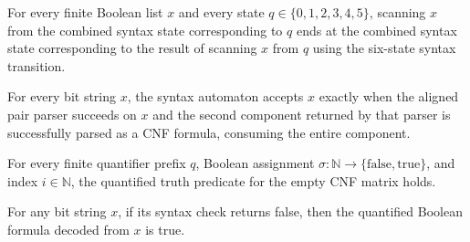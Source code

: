 \begin{theorem}
\label{Complexity.LogProg.TQBFARM.synStep_matrix}
\leanok
{}
For every finite Boolean list $x$ and every state $q \in \{0,1,2,3,4,5\}$, scanning $x$
from the combined syntax state corresponding to $q$ ends at the combined syntax state
corresponding to the result of scanning $x$ from $q$ using the six-state syntax
transition.
\end{theorem}

\begin{theorem}
\label{Complexity.LogProg.TQBFARM.synOK_spec}
\leanok
{}
For every bit string $x$, the syntax automaton accepts $x$ exactly when the aligned pair
parser succeeds on $x$ and the second component returned by that parser is successfully
parsed as a CNF formula, consuming the entire component.
\end{theorem}

\begin{theorem}
\label{Complexity.LogProg.TQBFARM.truthAux_nil}
\leanok
{}
For every finite quantifier prefix $q$, Boolean assignment
$\sigma:\mathbb{N}\to\{\mathrm{false},\mathrm{true}\}$, and index $i\in\mathbb{N}$, the
quantified truth predicate for the empty CNF matrix holds.
\end{theorem}

\begin{theorem}
\label{Complexity.LogProg.TQBFARM.truth_of_not_synOK}
\leanok
{}
For any bit string $x$, if its syntax check returns false, then the quantified Boolean
formula decoded from $x$ is true.
\end{theorem}

